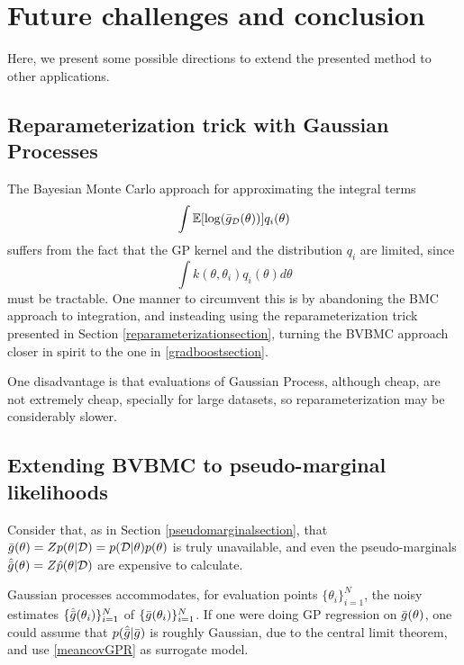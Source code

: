 \chapter{Future challenges and conclusion}
Here, we present some possible directions to extend the presented method to other applications.

\section{Reparameterization trick with Gaussian Processes}
The Bayesian Monte Carlo approach for approximating the integral terms
\begin{displaymath}
 \int {\mathbb E}[\log({\bar{g}}_\mathcal{D}(\theta))] q_i(\theta)
\end{displaymath}
suffers from the fact that the GP kernel and the distribution $q_i$ are limited, since
\begin{displaymath}
 \int k(\theta,\theta_i) q_i(\theta) d\theta
\end{displaymath}
must be tractable. One manner to circumvent this is by abandoning the BMC approach to integration, and insteading using the reparameterization trick presented in Section \ref{reparameterizationsection}, turning the BVBMC approach closer in spirit to the one in \ref{gradboostsection}.

One disadvantage is that evaluations of Gaussian Process, although cheap, are not extremely cheap, specially for large datasets, so reparameterization may be considerably slower.

\section{Extending BVBMC to pseudo-marginal likelihoods}
Consider that, as in Section \ref{pseudomarginalsection}, that ${\bar{g}}(\theta) = Z p(\theta|\mathcal{D}) = p(\mathcal{D}|\theta) p(\theta)$ is truly unavailable, and even the pseudo-marginals $\hat{{\bar{g}}}(\theta) = Z \hat{p}(\theta|\mathcal{D})$ are expensive to calculate.

Gaussian processes accommodates, for evaluation points $\{\theta_i\}_{i=1}^N$, the noisy estimates $\{\hat{{\bar{g}}}(\theta_i)\}_{i=1}^N$ of $\{{\bar{g}}(\theta_i)\}_{i=1}^N$. If one were doing GP regression on ${\bar{g}}(\theta)$, one could assume that $p(\hat{{\bar{g}}}|{\bar{g}})$ is roughly Gaussian, due to the central limit theorem, and use \eqref{meancovGPR} as surrogate model.

